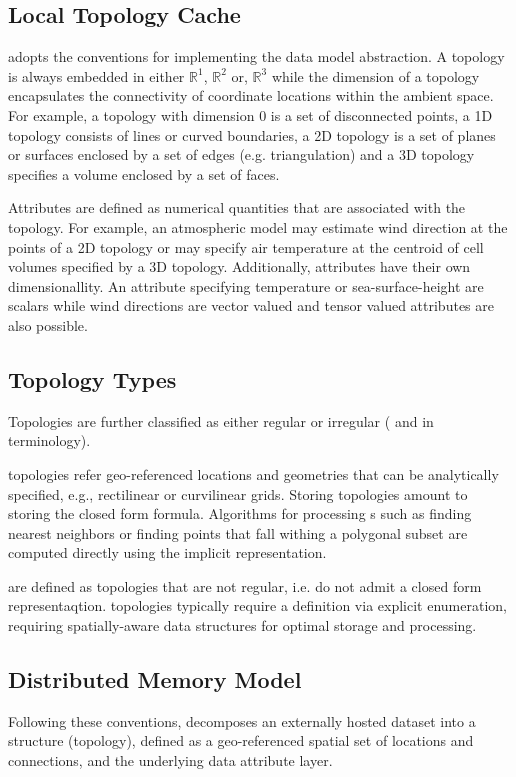 \subsection{Local Topology Cache}

\sciwms{} adopts the \cfugrid{} conventions for implementing the data model abstraction. A topology is always embedded in either $\mathbb{R}^1$,
$\mathbb{R}^2$ or, $\mathbb{R}^3$ while the dimension of a topology
encapsulates the connectivity of coordinate locations within the
ambient space. For example, a topology with dimension 0 is a set of
disconnected points, a 1D topology consists of lines or curved
boundaries, a 2D topology is a set of planes or surfaces enclosed by a
set of edges (e.g. triangulation) and a 3D topology specifies a
volume enclosed by a set of faces.

Attributes are defined as numerical quantities that are associated
with the topology. For example, an atmospheric model may estimate wind
direction at the points of a 2D topology or may specify air
temperature at the centroid of cell volumes specified by a 3D
topology. Additionally, attributes have their  own dimensionallity. An
attribute specifying temperature or sea-surface-height are scalars
while wind directions are vector valued and tensor valued attributes are
also possible.

\subsection{Topology Types}
Topologies are further classified as either regular or irregular
({\bf \cgrid{}} and {\bf \ugrid} in \sciwms{} terminology).

{\bf \cgrid{}} topologies refer geo-referenced locations and geometries that can be analytically specified, e.g., rectilinear
or curvilinear grids. Storing \cgrid{} topologies amount to storing
the closed form formula. Algorithms for processing \cgrid{}s such as
finding nearest neighbors or finding points that fall withing a
polygonal subset are computed directly using the implicit \cgrid{}
representation.

{\bf \ugrid{}} are defined as topologies that are not regular, i.e. do not admit a closed form representaqtion. \ugrid{} topologies typically require a definition via explicit enumeration, requiring spatially-aware data structures for optimal storage and processing.

\subsection{Distributed Memory Model}
Following these conventions, \sciwms{} decomposes an externally hosted
dataset into a structure (topology), defined as a geo-referenced
spatial set of locations and connections, and the underlying data
attribute layer.

